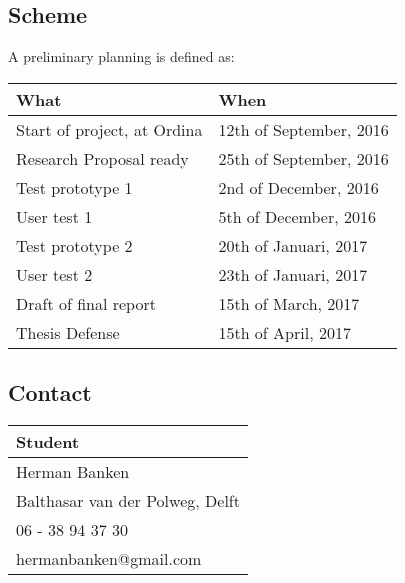 \subsection{Scheme} A preliminary planning is defined as:
\begin{table}[h]
    \centering
    \begin{tabular}{@{}ll@{}}
        \textbf{What}               & \textbf{When}           \\ 
        \hline
        Start of project, at Ordina & 12th of September, 2016 \\ 
        Research Proposal ready     & 25th of September, 2016 \\ 
        \hline
        Test prototype 1            & 2nd of December, 2016   \\ 
        User test 1                 & 5th of December, 2016   \\ 
        \hline
        Test prototype 2            & 20th of Januari, 2017   \\ 
        User test 2                 & 23th of Januari, 2017   \\ 
        \hline
        Draft of final report       & 15th of March, 2017     \\ 
        \hline
        Thesis Defense              & 15th of April, 2017     \\ 
    \end{tabular}
\end{table}

\subsection{Contact}

\begin{table}[h]
    \centering
    \begin{tabular}{@{}l@{}}
        \textbf{Student}                \\ 
        \hline
        Herman Banken                   \\ 
        Balthasar van der Polweg, Delft \\ 
        06 - 38 94 37 30                \\ 
        hermanbanken@gmail.com          \\ 
    \end{tabular}
\end{table}

